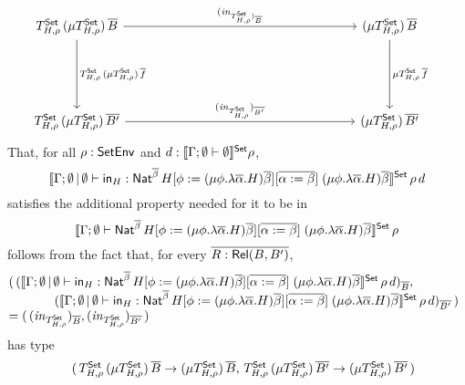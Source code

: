 \documentclass{lmcs}
\theoremstyle{plain}\newtheorem{satz}[thm]{Satz}
\newcommand{\set}{\mathsf{Set}}
\begin{document}
\begin{itemize}
  {\tiny
  \[\hspace*{-0.15in}\begin{tikzcd}[column sep=2.5in, row sep=0.75in]
T^\set_{H,\rho}\, (\mu
T^\set_{H,\rho})\, \ol{B} \ar[d, "{T^\set_{H,\rho}\, (\mu T^\set_{H,\rho})\, \ol{f}}"]
\ar[r,"{(\mathit{in}_{T^\set_{H,\rho})_{\ol{B}}}}" ] & 
  (\mu T^\set_{H,\rho})\, \ol{B}
\ar[d,"{\mu {T^\set_{H,\rho}}\, {\ol{f}}}" ] 
\\
T^\set_{H,\rho}\, (\mu T^\set_{H,\rho})\,
\ol{B'} \ar[r, "{(\mathit{in}_{T^\set_{H,\rho}})_{\ol{B'}}}"] & (\mu
T^\set_{H,\rho})\, 
\ol{B'}
\end{tikzcd}\]
}
  That, for all $\rho : \mathsf{SetEnv}$ and $d :
\setsem{\Gamma;\emptyset \vdash \emptyset}\rho$,
\[\setsem{\Gamma;\emptyset \,|\, \emptyset \vdash
  \tin_H : \Nat^{\ol{\beta}} \, H[\phi := (\mu \phi.\lambda
    {\overline \alpha}.H){\overline \beta}][\ol{\alpha := \beta}]
  \;(\mu \phi.\lambda {\overline \alpha}.H){\overline
    \beta}}\,\rho\,d\] satisfies the additional property needed for
it to be in 
\[\setsem{\Gamma;\emptyset \vdash
  \Nat^{\ol{\beta}} \, H[\phi := (\mu \phi.\lambda
    {\overline \alpha}.H){\overline \beta}][\ol{\alpha := \beta}]
  \;(\mu \phi.\lambda {\overline \alpha}.H){\overline \beta}}\,\rho\]
follows from the fact that, for every $\overline{R : \mathsf{Rel}(B,B')}$,
\[\hspace*{-0.2in}
  \begin{array}{ll}
 & (\,(\setsem{\Gamma;\emptyset \,|\, \emptyset \vdash \tin_H :
      \Nat^{\ol{\beta}} \, H[\phi := (\mu \phi.\lambda
        {\overline \alpha}.H){\overline \beta}][\ol{\alpha := \beta}]
      \;(\mu \phi.\lambda {\overline \alpha}.H){\overline
        \beta}}\,\rho\,d)_{\ol{B}},\,\\ & \hspace*{0.5in}(\setsem{\Gamma;\emptyset
      \,|\, \emptyset \vdash \tin_H : \Nat^{\ol{\beta}} \,
      H[\phi := (\mu \phi.\lambda {\overline \alpha}.H){\overline
          \beta}][\ol{\alpha := \beta}] \;(\mu \phi.\lambda {\overline
        \alpha}.H){\overline
        \beta}}\,\rho\,d)_{\ol{B'}}\,)\\ &= (\,
    (\mathit{in}_{T^\set_{H,\rho}})_{\ol{B}},
    (\mathit{in}_{T^\set_{H,\rho}})_{\ol{B'}}\,)
\end{array}\]
has type
\[\begin{array}{ll}
& (\, T^\set_{H,\rho}\, (\mu T^\set_{H,\rho}) \, \ol{B} \to (\mu
T^\set_{H,\rho}) \, \ol{B}, \, T^\set_{H,\rho}\, (\mu T^\set_{H,\rho})
\, \ol{B'} \to (\mu T^\set_{H,\rho}) \,\ol{B'} \, )\\[1ex]

\end{array}\]
\end{itemize}
\end{document}
